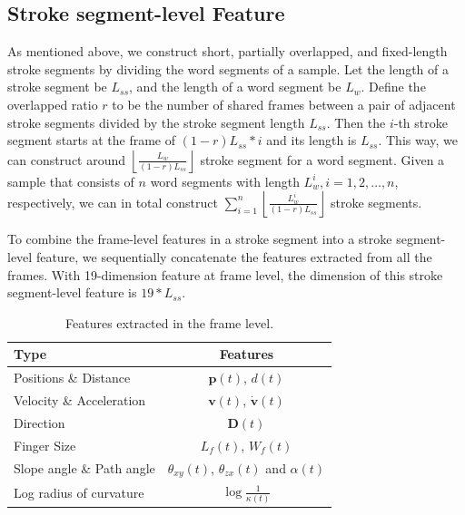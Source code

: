 \subsection{Stroke segment-level Feature}


As mentioned above, we construct short, partially overlapped, and fixed-length stroke segments by dividing the word segments of a sample. Let the length of a stroke segment be $L_{ss}$, and the length of a word segment be $L_w$. 
Define the overlapped ratio $r$ to be the number of shared frames between a pair of adjacent stroke segments divided by the stroke segment length $L_{ss}$. Then the $i$-th stroke segment starts at the frame of $(1-r)L_{ss} * i$ and its length is $L_{ss}$. 
This way, we can construct around $\left \lfloor\frac{L_w}{(1-r)L_{ss}}\right \rfloor$ stroke segment for a word segment.
Given a sample that consists of $n$ word segments with length $L^i_{w}, i=1,2,\ldots, n$, respectively, we can in total construct 
$\sum^n_{i=1} \left \lfloor \frac{L^i_w}{(1-r)L_{ss}}\right \rfloor$ stroke segments. 



To combine the frame-level features in a stroke segment into a stroke segment-level feature,  we sequentially concatenate the features extracted from all the frames. With 19-dimension feature at frame level, the dimension of this stroke segment-level feature is $19 * L_{ss}$.




\begin{table}[!t]
\centering  %
\caption{{Features extracted in the frame level. }}
\vspace{0mm}
\begin{tabular}{|l|c|}
    \hline \textbf{Type} & \textbf{Features }                            \\ \hline\hline
     Positions \& Distance & $\textbf{p}(t)$, $d(t)$ \\
        Velocity \& Acceleration & ${{\textbf{v}}}(t)$,  ${\dot{\textbf{v}}}(t)$       \\
        Direction & ${{\textbf{D}}}(t)$          \\
        Finger Size & $L_f(t)$, $W_f(t)$ \\        		
        Slope angle	\& Path angle & $\theta_{xy}(t)$, $\theta_{zx}(t)$ and $\alpha(t)$\\
        Log radius of curvature &   $\log\frac{1}{\kappa(t)}$ \\
        \hline
    \end{tabular}
    \label{tab:features}
\end{table}


